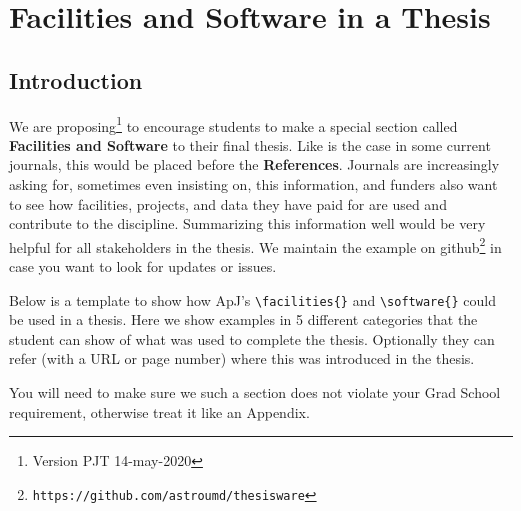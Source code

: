 \documentclass[12pt]{article}
\begin{document}
\section{Facilities and Software in a Thesis}


\subsection{Introduction}

\label{random}

We are proposing\footnote{Version PJT 14-may-2020} to encourage
students to make a special section called {\bf Facilities and
  Software} to their final thesis. Like is the case in some current
journals, this would be placed before the {\bf References}. Journals
are increasingly asking for, sometimes even insisting on, this
information, and funders also want to see how facilities, projects,
and data they have paid for are used and contribute to the
discipline. Summarizing this information well would be very helpful
for all stakeholders in the thesis. We maintain the example
on github\footnote{\tt https://github.com/astroumd/thesisware} in
case you want to look for updates or issues. 


Below is a template to show how ApJ's \verb+\facilities{}+ and
\verb+\software{}+ could be used in a thesis. Here we show examples in
5 different categories that the student can show of what was used to
complete the thesis. Optionally they can refer (with a URL or page
number) where this was introduced in the thesis.

You will need to make sure we such a section does not
violate your Grad School requirement, otherwise treat it like an Appendix.



\end{document}
